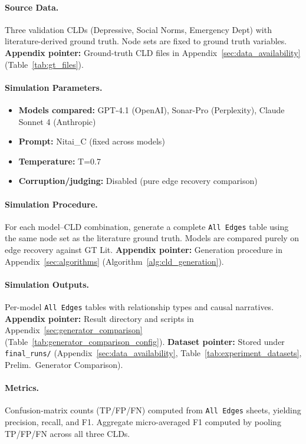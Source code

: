 \paragraph{Source Data.}
Three validation CLDs (Depressive, Social Norms, Emergency Dept) with literature-derived ground truth. Node sets are fixed to ground truth variables.
\textbf{Appendix pointer:} Ground-truth CLD files in Appendix~\ref{sec:data_availability} (Table~\ref{tab:gt_files}).

\paragraph{Simulation Parameters.}
\begin{itemize}[noitemsep]
    \item \textbf{Models compared:} GPT-4.1 (OpenAI), Sonar-Pro (Perplexity), Claude Sonnet 4 (Anthropic)
    \item \textbf{Prompt:} Nitai\_C (fixed across models)
    \item \textbf{Temperature:} T=0.7
    \item \textbf{Corruption/judging:} Disabled (pure edge recovery comparison)
\end{itemize}

\paragraph{Simulation Procedure.}
For each model--CLD combination, generate a complete \texttt{All Edges} table using the same node set as the literature ground truth. Models are compared purely on edge recovery against GT Lit.
\textbf{Appendix pointer:} Generation procedure in Appendix~\ref{sec:algorithms} (Algorithm~\ref{alg:cld_generation}).

\paragraph{Simulation Outputs.}
Per-model \texttt{All Edges} tables with relationship types and causal narratives.
\textbf{Appendix pointer:} Result directory and scripts in Appendix~\ref{sec:generator_comparison} (Table~\ref{tab:generator_comparison_config}).
\textbf{Dataset pointer:} Stored under \texttt{final\_runs/} (Appendix~\ref{sec:data_availability}, Table~\ref{tab:experiment_datasets}, Prelim.\ Generator Comparison).

\paragraph{Metrics.}
Confusion-matrix counts (TP/FP/FN) computed from \texttt{All Edges} sheets, yielding precision, recall, and F1. Aggregate micro-averaged F1 computed by pooling TP/FP/FN across all three CLDs.

